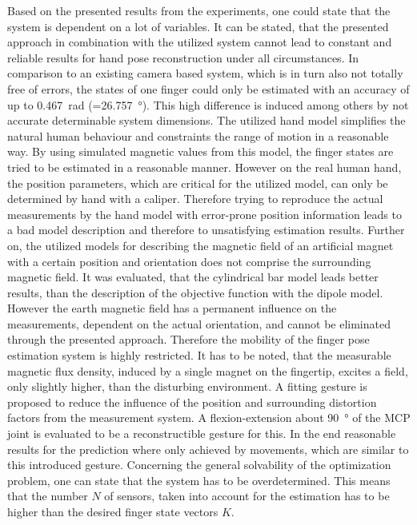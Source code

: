 Based on the presented results from the experiments, one could state that the system is dependent on a lot of variables. It can be stated, that the presented approach in combination with the utilized system cannot lead to constant and reliable results for hand pose reconstruction under all circumstances. In comparison to an existing camera based system, which is in turn also not totally free of errors, the states of one finger could only be estimated with an accuracy of up to \SI{0.467}{\radian} (=\SI{26.757}{\degree}). This high difference is induced among others by not accurate determinable system dimensions. The utilized hand model simplifies the natural human behaviour and constraints the range of motion in a reasonable way. By using simulated magnetic values from this model, the finger states are tried to be estimated in a reasonable manner. However on the real human hand, the position parameters, which are critical for the utilized model, can only be determined by hand with a caliper. Therefore trying to reproduce the actual measurements by the hand model with error-prone position information leads to a bad model description and therefore to unsatisfying estimation results. Further on, the utilized models for describing the magnetic field of an artificial magnet with a certain position and orientation does not comprise the surrounding magnetic field. It was evaluated, that the cylindrical bar model leads better results, than the description of the objective function with the dipole model. However the earth magnetic field has a permanent influence on the measurements, dependent on the actual orientation, and cannot be eliminated through the presented approach. Therefore the mobility of the finger pose estimation system is highly restricted. It has to be noted, that the measurable magnetic flux density, induced by a single magnet on the fingertip, excites a field, only slightly higher, than the disturbing environment. A fitting gesture is proposed to reduce the influence of the position and surrounding distortion factors from the measurement system. A flexion-extension about \SI{90}{\degree} of the \ac{MCP} joint is evaluated to be a reconstructible gesture for this. In the end reasonable results for the prediction where only achieved by movements, which are similar to this introduced gesture. Concerning the general solvability of the optimization problem, one can state that the system has to be overdetermined. This means that the number $ N $ of sensors, taken into account for the estimation has to be higher than the desired finger state vectors $ K $. 



